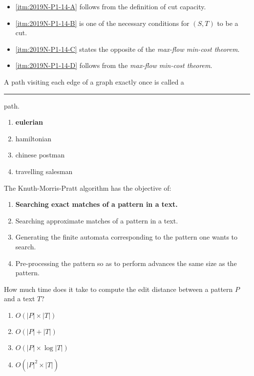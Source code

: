 \documentclass{cal}
\begin{document}
{\ansseparator

\newpage
\begin{itemize}
    \item[] \ref{itm:2019N-P1-14-A} follows from the definition of cut capacity.
    \item[] \ref{itm:2019N-P1-14-B} is one of the necessary conditions for $(S,T)$ to be a cut.
    \item[] \ref{itm:2019N-P1-14-C} states the opposite of the \emph{max-flow min-cost theorem}.
    \item[] \ref{itm:2019N-P1-14-D} follows from the \emph{max-flow min-cost theorem}.  
\end{itemize}

A path visiting each edge of a graph exactly once is called a \rule{2.5cm}{0.15mm} path.
\begin{enumerate}[label=\Alph*)]\itemsep0em
    \item \textbf{eulerian \greencheckmark}
    \item hamiltonian
    \item chinese postman
    \item travelling salesman
\end{enumerate}

The Knuth-Morris-Pratt algorithm has the objective of:
\begin{enumerate}[label=\Alph*)]\itemsep0em
    \item \textbf{Searching exact matches of a pattern in a text. \greencheckmark}
    \item Searching approximate matches of a pattern in a text.
    \item Generating the finite automata corresponding to the pattern one wants to search.
    \item Pre-processing the pattern so as to perform advances the same size as the pattern.
\end{enumerate}

How much time does it take to compute the edit distance between a pattern $P$ and a text $T$?
\begin{enumerate}[label=\Alph*)]\itemsep0em
    \item $O(|P| \times |T|)$ \greencheckmark
    \item $O(|P| + |T|)$
    \item $O(|P| \times \log |T|)$
    \item $O(|P|^2 \times |T|)$
\end{enumerate}

}
\end{document}
